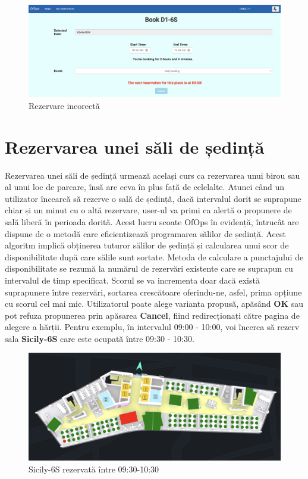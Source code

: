 \begin{figure}[!htb]
    \centering
    \includegraphics[width=0.9\linewidth]{images/rezerv incorect.png}
    \caption{Rezervare incorectă}
    \label{fig:rezerv incorect}
\end{figure}

\section{Rezervarea unei săli de ședință}

Rezervarea unei săli de ședință urmează același curs ca rezervarea unui birou sau al unui loc de parcare, însă are ceva în plus față de celelalte. Atunci când un utilizator încearcă să rezerve o sală de ședință, dacă intervalul dorit se suprapune chiar și un minut cu o altă rezervare, user-ul va primi ca alertă o propunere de sală liberă în perioada dorită. Acest lucru scoate OfOps în evidență, întrucât are dispune de o metodă care eficientizează programarea sălilor de ședință. Acest algoritm implică obținerea tuturor sălilor de ședință și calcularea unui scor de disponibilitate după care sălile sunt sortate. Metoda de calculare a punctajului de disponibilitate se rezumă la numărul de rezervări existente care se suprapun cu intervalul de timp specificat. Scorul se va incrementa doar dacă există suprapunere între rezervări, sortarea crescătoare oferindu-ne, asfel, prima opțiune cu scorul cel mai mic. Utilizatorul poate alege varianta propusă, apăsând \textbf{OK} sau pot refuza propunerea prin apăsarea \textbf{Cancel}, fiind redirecționați către pagina de alegere a hărții. Pentru exemplu, în intervalul 09:00 - 10:00, voi încerca să rezerv sala \textbf{Sicily-6S} care este ocupată între 09:30 - 10:30.

\begin{figure}[!htb]
    \centering
    \includegraphics[width=0.9\linewidth]{images/sicily rezerv1.png}
    \caption{Sicily-6S rezervată între 09:30-10:30}
    \label{fig:sicily rezerv1.png}
\end{figure}

